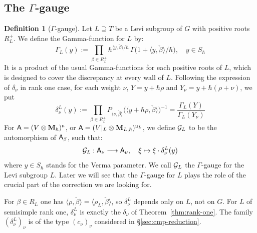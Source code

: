 \documentclass{article}
\theoremstyle{plain}
\theoremstyle{definition}
\newtheorem{definition}[theorem]{Definition}
\theoremstyle{remark}
\numberwithin{equation}{section}
\begin{document}
\subsection{The \texorpdfstring{$\Gamma$}{Gamma}-gauge}\label{sec:disc-gauge}

\begin{definition}[$\Gamma$-gauge]\label{def:gauge}
Let $L\supseteq T$ be a Levi subgroup of $G$ with positive roots $R_L^+$. We define the Gamma-function for $L$ by:
\begin{equation*}
    \Gamma_L(y):=\prod_{\beta\in R_L^+}\hbar^{\langle y,\check\beta\rangle/\hbar}\,\Gamma\bigl(1+\langle y,\check\beta\rangle/\hbar\bigr), \quad y\in S_\hbar
\end{equation*}
It is a product of the usual Gamma-functions for each positive roots of $L$, which is designed to cover the discrepancy at every wall of $L$. Following the expression of $\delta_\nu$ in rank one case, for each weight $\nu$, $Y=y+\hbar \rho$ and $Y_\nu = y+\hbar(\rho +\nu)$, we put
\[
\delta^L_\nu(y):=\prod_{\beta\in R_L^+}P_{\langle\nu,\check\beta\rangle}\bigl(\langle y+\hbar\rho,\check\beta\rangle\bigr)^{-1}
=\frac{\Gamma_L(Y)}{\Gamma_L(Y_\nu)}
\]
For $\mathsf A=(V\otimes\mathbf{M}_\hbar)^{\mathfrak{u}}$, or $\mathsf A = (V|_L \otimes \mathbf{M}_{L,\hbar})^{\mathfrak{u}_L}$, we define $\mathcal G_L$ to be the automorphism of $\mathsf A_\beta$, such that:
\begin{equation*}
    \mathcal G_L : \mathsf A_\nu \longrightarrow \mathsf A_\nu,\quad \xi \mapsto \xi \cdot\delta_\nu^L (y)
\end{equation*}
where $y\in S_\hbar$ stands for the Verma parameter. We call $\mathcal G_L$ the $\Gamma$-gauge for the Levi subgroup $L$. Later we will see that the $\Gamma$-gauge for $L$ plays the role of the crucial part of the correction we are looking for.
\end{definition}

For $\beta\in R_L$ one has $\langle\rho,\check\beta\rangle=\langle\rho_L,\check\beta\rangle$, so $\delta^L_\nu$ depends only on $L$, not on $G$. For $L$ of semisimple rank one, $\delta^L_\nu$ is exactly the $\delta_\nu$ of Theorem~\ref{thm:rank-one}. The family $(\delta^L_\nu)_\nu$ is of the type $(c_\nu)_\nu$ considered in \S\ref{sec:cmp-reduction}.
\end{document}
